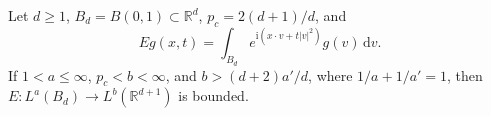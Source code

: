 Let $d\geq1$, $B_d=B(0,1)\subset\mathbb R^d$, $p_c=2(d+1)/d$, and
\[
Eg(x,t)=\int_{B_d}e^{\mathrm i(x\cdot v+t|v|^2)}g(v)\,\mathrm dv.
\]
If $1<a\leq\infty$, $p_c<b<\infty$, and $b>(d+2)a'/d$, where $1/a+1/a'=1$, then $E:L^a(B_d)\to L^b(\mathbb R^{d+1})$ is bounded.
